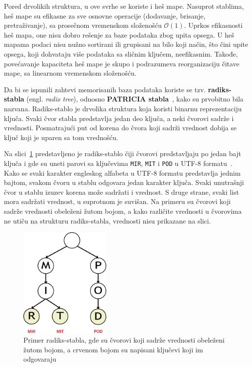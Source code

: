 \documentclass[12pt,oneside]{memoir}
\begin{document}
Pored drvolikih struktura, u ove svrhe se koriste i heš mape. Nasuprot
stablima, heš mape su efikasne za sve osnovne operacije (dodavanje, brisanje, pretraživanje),
sa prosečnom vremenskom složenošću $ \mathcal{O}(1) $. Uprkos efikasnosti heš mapa, one nisu
dobro rešenje za baze podataka zbog upita opsega. U heš mapama podaci nisu nužno sortirani ili
grupisani na bilo koji način, što čini upite opsega, koji dohvataju više podataka
sa sličnim ključem, neefikasnim.
Takođe, povećavanje kapaciteta heš mape je skupo i podrazumeva reorganizaciju
čitave mape, sa linearnom vremenskom složenošću.

Da bi se ispunili zahtevi memorisanih baza podataka koriste se tzv.
\textbf{radiks-stabla} (engl. \emph{radix tree}), odnosno
\textbf{PATRICIA stabla}~\cite{patricia}, kako su prvobitno bila nazvana.
Radiks-stablo je drvolika struktura koja koristi binarnu reprezentaciju ključa.
Svaki čvor stabla predstavlja jedan deo ključa, a neki čvorovi
sadrže i vrednosti. Posmatrajući put od korena do čvora koji
sadrži vrednost dobija se ključ koji je uparen sa tom
vrednošću.

Na slici~\ref{fig:radix} predstavljeno je radiks-stablo
čiji čvorovi predstavljaju po jedan bajt ključa i gde su uneti parovi sa
ključevima \texttt{MIR}, \texttt{MIT} i \texttt{POD} u
UTF-8 formatu~\cite{unicode}.
Kako se svaki karakter engleskog alfabeta u UTF-8 formatu predstavlja
jednim bajtom, svakom čvoru u stablu odgovara jedan karakter
ključa. Svaki unutrašnji čvor u stablu izuzev korena može sadržati i vrednost.
S druge strane, svaki list mora sadržati vrednost, u suprotnom je suvišan.
Na primeru su čvorovi koji sadrže vrednosti obeleženi žutom bojom,
a kako različite vrednosti u čvorovima ne utiču na strukturu
radiks-stabla, vrednosti nisu prikazane na slici.

\begin{figure}[!h]
  \centering
  \includegraphics[width=0.40\textwidth]{radix_tree.eps}
  \caption{Primer radiks-stabla, gde su čvorovi koji sadrže vrednosti
    obeleženi žutom bojom, a crvenom bojom su napisani ključevi koji im
    odgovaraju}
  \label{fig:radix}
\end{figure}
\end{document}
